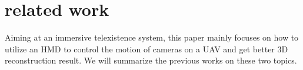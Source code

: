 \documentclass[journal]{IEEEtran}
\begin{document}



\section{related work}
Aiming at an immersive telexistence system, this paper mainly focuses on how 
to utilize an HMD to control the motion of cameras on a UAV and get better 3D 
reconstruction result. We will summarize the previous works on these two topics.
\end{document}
